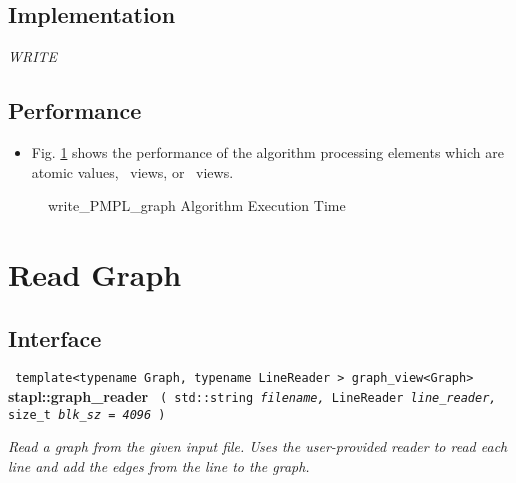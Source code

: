 \subsection{Implementation} \label{sec-wr-pmpl-alg-impl}

\textit{WRITE}

\subsection{Performance} \label{sec-wr-pmpl-alg-perf}

\begin{itemize}
\item
Fig. \ref{fig:wr-pmpl-alg-exec-exper}
shows the performance of the algorithm processing
elements which are atomic values, \stl\ views, or \stapl\ views.
\end{itemize}

\begin{figure}[p]
\caption{ write\_PMPL\_graph Algorithm Execution Time}
\label{fig:wr-pmpl-alg-exec-exper}
\end{figure}


\section{ Read Graph}
\label{sec-rd-graf-alg}

\subsection{Interface} \label{sec-rd-graf-alg-inter}

\noindent
\texttt{%
template<typename Graph, typename LineReader >
\newline
graph\_view<Graph> 
}
\newline
\textbf{stapl::graph\_reader}%
\newline
\texttt{%
(
std::string
\textit{filename,}%
LineReader
\textit{line\_reader,}%
size\_t
\textit{blk\_sz = 4096}%
)     
}
\vspace{0.4cm}

\textit{
Read a graph from the given input file.  
Uses the user-provided reader to read each line and add the edges from the line to the graph.
}
\vspace{0.4cm}

